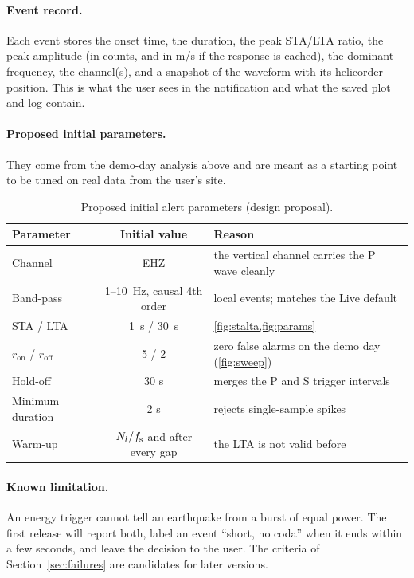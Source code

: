 \paragraph{Event record.} Each event stores the onset time, the duration, the peak STA/LTA ratio, the peak amplitude (in counts, and in
m/s if the response is cached), the dominant frequency, the channel(s), and a snapshot of the waveform with its helicorder
position. This is what the user sees in the notification and what the saved plot and log contain.

\paragraph{Proposed initial parameters.} They come from the demo-day analysis above and are meant as a starting point to be
tuned on real data from the user's site.

\begin{table}[tbp]
\centering\small
\caption{Proposed initial alert parameters (design proposal).}\label{tab:alertparams}
\begin{tabularx}{\linewidth}{@{}l c X@{}}
\toprule
Parameter & Initial value & Reason\\ \midrule
Channel & EHZ & the vertical channel carries the P wave cleanly\\
Band-pass & 1--10~Hz, causal 4th order & local events; matches the Live default\\
STA / LTA & 1~s / 30~s & \cref{fig:stalta,fig:params}\\
$r_{\mathrm{on}}$ / $r_{\mathrm{off}}$ & 5 / 2 & zero false alarms on the demo day (\cref{fig:sweep})\\
Hold-off & 30 s & merges the P and S trigger intervals\\
Minimum duration & 2 s & rejects single-sample spikes\\
Warm-up & $N_l/f_{\mathrm{s}}$ and after every gap & the LTA is not valid before\\
\bottomrule
\end{tabularx}
\end{table}

\paragraph{Known limitation.} An energy trigger cannot tell an earthquake from a burst of equal power. The first release will
report both, label an event ``short, no coda'' when it ends within a few seconds, and leave the decision to the user. The
criteria of Section~\ref{sec:failures} are candidates for later versions.

